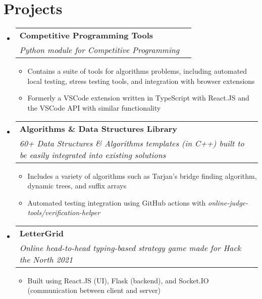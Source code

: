 \documentclass[letterpaper,11pt]{article}
\makeatletter
\newcommand{\resumeText}[1]{
  \item\small{
    \textbf{}{#1 \vspace{-2pt}}
  }
}
\newcommand{\resumeSubheading}[4]{
  \vspace{-1pt}\item
    \begin{tabular*}{0.97\textwidth}[t]{l@{\extracolsep{\fill}}r}
      \textbf{#1} & #2 \\
      \textit{\small#3} & \textit{\small #4} \\
    \end{tabular*}\vspace{-5pt}
}
\newcommand{\resumeSubHeadingListStart}{\begin{itemize}[leftmargin=*]}
\newcommand{\resumeSubHeadingListEnd}{\end{itemize}}
\newcommand{\resumeItemListStart}{\begin{itemize}}
\newcommand{\resumeItemListEnd}{\end{itemize}\vspace{-5pt}}
\newcommand{\link}[2]{\href{#1}{#2}}
\makeatother
\begin{document}
\section{Projects}
  \resumeSubHeadingListStart
    \resumeSubheading{Competitive Programming Tools \link{https://github.com/plasmatic1/competitive-programming-tools}{\faGithub} \link{https://github.com/plasmatic1/cp-tools-console}{\faGithub}}{}
      {Python module for Competitive Programming}{}
      \resumeItemListStart
        \resumeText{Contains a suite of tools for algorithms problems, including automated local testing, stress testing tools, and integration with browser extensions}
        \resumeText{Formerly a VSCode extension written in TypeScript with React.JS and the VSCode API with similar functionality}
      \resumeItemListEnd
    \resumeSubheading{Algorithms \& Data Structures Library \link{https://github.com/plasmatic1/templates}{\faGithub}}{}
      {60+ Data Structures \& Algorithms templates (in C++) built to be easily integrated into existing solutions}{}
      \resumeItemListStart
        \resumeText{Includes a variety of algorithms such as Tarjan's bridge finding algorithm, dynamic trees, and suffix arrays}{}
        \resumeText{Automated testing integration using GitHub actions with \textit{online-judge-tools/verification-helper}}
      \resumeItemListEnd
    \resumeSubheading{LetterGrid \link{https://devpost.com/software/typecycles}{\faLink}}{}
      {Online head-to-head typing-based strategy game made for Hack the North 2021}{}
      \resumeItemListStart
        \resumeText{Built using React.JS (UI), Flask (backend), and Socket.IO (communication between client and server)}{}
      \resumeItemListEnd
  \resumeSubHeadingListEnd

\end{document}
